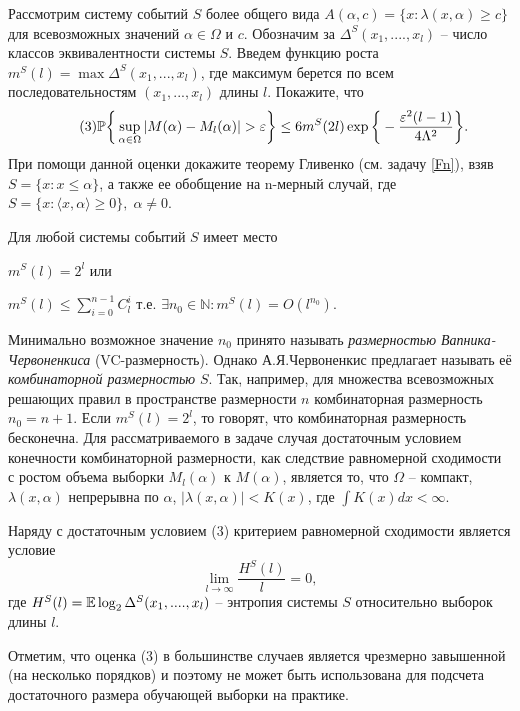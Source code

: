 \begin{problem}
Рассмотрим систему событий $S$ более общего вида $A(\alpha, c) = \{x: \lambda(x, \alpha) \geq c\}$ для всевозможных значений $\alpha \in \Omega$ и $c$. Обозначим за $\Delta^S(x_1,...., x_l)$ -- число классов  эквивалентности системы $S$. Введем функцию роста $m^S(l) = \max \Delta^S(x_1,..., x_l)$, где максимум берется по всем последовательностям $(x_1,...,x_l)$ длины $l$. Покажите, что 
\[\tag{3}
\mathrm{{\mathbb P}} \bigg\{\sup \limits_{\alpha \in \Omega} |M(\alpha) - M_l(\alpha)| > \varepsilon \bigg\} \leq 6m^S(2l)\exp\bigg\{-\frac{\varepsilon^2 (l -1)}{4\Lambda^2}\bigg\}.
\]
При помощи данной оценки докажите теорему Гливенко (см. задачу \ref{Fn}), взяв $S = \{x: x \leq \alpha\}$, а также ее обобщение на n-мерный случай, где  $S = \{x:  \langle x, \alpha \rangle \geq 0 \}, \; \alpha \neq 0$.
\end{problem}
\begin{remark} Для любой системы событий $S$ имеет место
\begin{center}
$m^S(l) = 2^l$ или 
\end{center}
\begin{center}
$m^S(l) \leq \sum \limits_{i=0}^{n-1}C_l^i$ 
т.е. $\exists n_0 \in \mathbb{N}: m^S(l) = O(l^{n_0})$.
\end{center}
Минимально возможное значение $n_0$ принято называть \textit{размерностью Вапника-Червоненкиса} (VC-размерность). Однако А.Я.Червоненкис предлагает называть её \textit{комбинаторной размерностью} $S$. Так, например, для множества всевозможных решающих правил в пространстве размерности $n$ комбинаторная размерность $n_0 = n + 1$. Если $m^S(l) = 2^l$, то говорят, что комбинаторная размерность бесконечна. Для рассматриваемого в задаче случая достаточным условием конечности комбинаторной размерности, как следствие равномерной сходимости с ростом объема выборки $M_{l}(\alpha)$ к  $M(\alpha)$, является то, что $\Omega$ -- компакт, $\lambda(x, \alpha)$ непрерывна по $\alpha$, $|\lambda(x, \alpha)| < K(x)$, где $\int K(x)dx < \infty$.

Наряду с достаточным условием (3) критерием равномерной сходимости является условие
\[
\lim \limits_{l \to \infty} \frac{H^S(l)}{l} = 0,
\] 
где $H^S(l) = \mathrm{{\mathbb E}} \log_2 \Delta^S(x_1,...., x_l)$ -- энтропия системы $S$ относительно выборок длины $l$.

Отметим, что оценка (3) в большинстве случаев является чрезмерно завышенной (на несколько порядков) и поэтому не может быть использована для подсчета достаточного размера обучающей выборки на практике.     
\end{remark}



